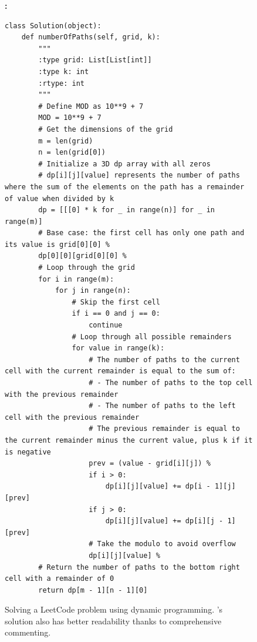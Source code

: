 \begin{figure}[H]
\begin{AIbox}{\DV}
{\bf \DV:}
\vspace{-0.1cm}
\begin{verbatim}
class Solution(object):
    def numberOfPaths(self, grid, k):
        """
        :type grid: List[List[int]]
        :type k: int
        :rtype: int
        """
        # Define MOD as 10**9 + 7
        MOD = 10**9 + 7
        # Get the dimensions of the grid
        m = len(grid)
        n = len(grid[0])
        # Initialize a 3D dp array with all zeros
        # dp[i][j][value] represents the number of paths where the sum of the elements on the path has a remainder of value when divided by k
        dp = [[[0] * k for _ in range(n)] for _ in range(m)]
        # Base case: the first cell has only one path and its value is grid[0][0] %
        dp[0][0][grid[0][0] %
        # Loop through the grid
        for i in range(m):
            for j in range(n):
                # Skip the first cell
                if i == 0 and j == 0:
                    continue
                # Loop through all possible remainders
                for value in range(k):
                    # The number of paths to the current cell with the current remainder is equal to the sum of:
                    # - The number of paths to the top cell with the previous remainder
                    # - The number of paths to the left cell with the previous remainder
                    # The previous remainder is equal to the current remainder minus the current value, plus k if it is negative
                    prev = (value - grid[i][j]) %
                    if i > 0:
                        dp[i][j][value] += dp[i - 1][j][prev]
                    if j > 0:
                        dp[i][j][value] += dp[i][j - 1][prev]
                    # Take the modulo to avoid overflow
                    dp[i][j][value] %
        # Return the number of paths to the bottom right cell with a remainder of 0
        return dp[m - 1][n - 1][0]
\end{verbatim}

\end{AIbox}
\caption{Solving a LeetCode problem using dynamic programming. \DV's solution also has better readability thanks to comprehensive commenting.}
\label{fig:leetcode}
\end{figure}












